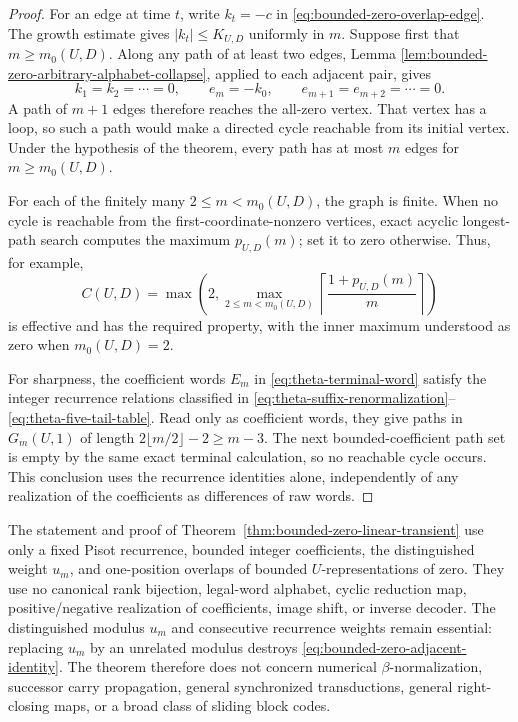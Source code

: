 \begin{proof}
For an edge at time $t$, write $k_t=-c$ in
\eqref{eq:bounded-zero-overlap-edge}.  The growth estimate gives
$|k_t|\le K_{U,D}$ uniformly in $m$.  Suppose first that
$m\ge m_0(U,D)$.  Along any path of at least two edges, Lemma
\ref{lem:bounded-zero-arbitrary-alphabet-collapse}, applied to each adjacent
pair, gives
\[
k_1=k_2=\cdots=0,\qquad
e_m=-k_0,\qquad e_{m+1}=e_{m+2}=\cdots=0.
\]
A path of $m+1$ edges therefore reaches the all-zero vertex.  That vertex
has a loop, so such a path would make a directed cycle reachable from its
initial vertex.  Under the hypothesis of the theorem, every path has at
most $m$ edges for $m\ge m_0(U,D)$.

For each of the finitely many $2\le m<m_0(U,D)$, the graph is finite.  When
no cycle is reachable from the first-coordinate-nonzero vertices, exact
acyclic longest-path search computes the maximum $p_{U,D}(m)$; set it to
zero otherwise.  Thus, for example,
\[
C(U,D)=\max\left(2,
 \max_{2\le m<m_0(U,D)}
 \left\lceil\frac{1+p_{U,D}(m)}m\right\rceil\right)
\]
is effective and has the required property, with the inner maximum understood
as zero when $m_0(U,D)=2$.

For sharpness, the coefficient words $E_m$ in
\eqref{eq:theta-terminal-word} satisfy the integer recurrence relations
classified in \eqref{eq:theta-suffix-renormalization}--
\eqref{eq:theta-five-tail-table}.  Read only as coefficient words, they give
paths in $G_m(U,1)$ of length
$2\lfloor m/2\rfloor-2\ge m-3$.  The next bounded-coefficient path set is
empty by the same exact terminal calculation, so no reachable cycle occurs.
This conclusion uses the recurrence identities alone, independently of any
realization of the coefficients as differences of raw words.
\end{proof}

\begin{remark}
\label{rem:bounded-zero-standard-object-boundary}
The statement and proof of Theorem~\ref{thm:bounded-zero-linear-transient}
use only a fixed Pisot recurrence, bounded integer coefficients, the
distinguished weight $u_m$, and one-position overlaps of bounded
$U$-representations of zero.  They use no canonical rank bijection, legal-word
alphabet, cyclic reduction map, positive/negative realization of
coefficients, image shift, or inverse decoder.  The distinguished modulus
$u_m$ and consecutive recurrence weights remain essential: replacing $u_m$
by an unrelated modulus destroys \eqref{eq:bounded-zero-adjacent-identity}.
The theorem therefore does not concern numerical $\beta$-normalization,
successor carry propagation, general synchronized transductions, general
right-closing maps, or a broad class of sliding block codes.
\end{remark}
